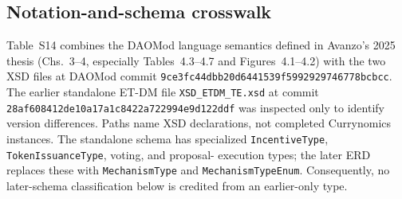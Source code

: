 \documentclass[10pt]{article}
\begin{document}
\clearpage
\begin{landscape}
\section*{Notation-and-schema crosswalk}
Table~S14 combines the DAOMod language semantics defined in Avanzo's 2025
thesis (Chs.~3--4, especially Tables~4.3--4.7 and Figures~4.1--4.2) with the
two XSD files at DAOMod commit
\nolinkurl{9ce3fc44dbb20d6441539f5992929746778bcbcc}. The earlier standalone
ET-DM file \texttt{XSD\_ETDM\_TE.xsd} at commit
\nolinkurl{28af608412de10a17a1c8422a722994e9d122ddf} was inspected only to
identify version differences. Paths name XSD declarations, not completed
Currynomics instances. The standalone schema has specialized
\texttt{IncentiveType}, \texttt{TokenIssuanceType}, voting, and proposal-
execution types; the later ERD replaces these with \texttt{MechanismType} and
\texttt{MechanismTypeEnum}. Consequently, no later-schema classification below
is credited from an earlier-only type.


\end{landscape}
\end{document}
